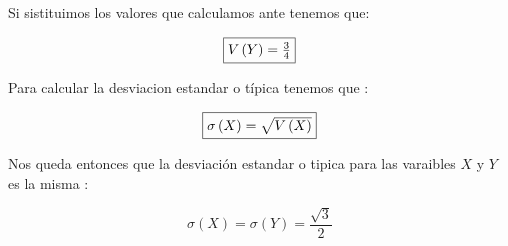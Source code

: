 \documentclass[12pt]{article}
\begin{document}
\begin{flushleft}
    Si sistituimos los valores que calculamos ante tenemos que:
\end{flushleft}

\begin{equation*}
    \fbox{$V\left(Y\right) = \frac{3}{4}$}
\end{equation*}

\begin{flushleft}
    Para calcular la desviacion estandar o t\'ipica tenemos que :
\end{flushleft}

\begin{equation*}
    \fbox{$\sigma \left(X\right) = \sqrt{V\left(X\right)} $}
\end{equation*}

\begin{flushleft}
    Nos queda entonces que la desviaci\'on estandar o tipica para las varaibles $X$ y $Y$
    es la misma :
\end{flushleft}

\begin{equation*}
    \displaystyle \sigma \left(X \right) = \sigma\left(Y\right)  = \frac{\sqrt{3}}{2}
\end{equation*}
\end{document}
